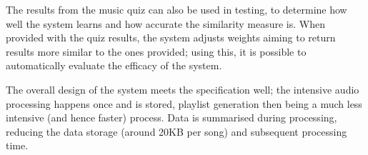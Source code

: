 The results from the music quiz can also be used in testing, to determine how well the system learns and how accurate the similarity measure is. When provided with the quiz results, the system adjusts weights aiming to return results more similar to the ones provided; using this, it is possible to automatically evaluate the efficacy of the system.

The overall design of the system meets the specification well; the intensive audio processing happens once and is stored, playlist generation then being a much less intensive (and hence faster) process. Data is summarised during processing, reducing the data storage (around 20KB per song) and subsequent processing time.

